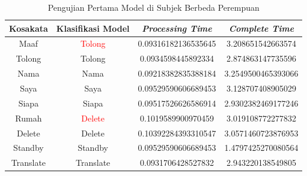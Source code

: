 \begin{longtable}{|c|c|c|c|}
  \caption{Pengujian Pertama Model di Subjek Berbeda Perempuan}
  \label{tb:prediksiperempuan1}                                   \\
  \hline
  \rowcolor[HTML]{C0C0C0}
  \textbf{Kosakata} & \textbf{Klasifikasi Model} & \textbf{\emph{Processing Time}} & \textbf{\emph{Complete Time}}\\
  \hline
  Maaf              & \textcolor{red}{Tolong}                        & 0.09316182136535645                           & 3.208651542663574                                  \\
  Tolong            & Tolong                        & 0.0934598445892334                           & 2.874863147735596                                  \\
  Nama              & Nama                        & 0.09218382835388184                           & 3.2549500465393066                                  \\
  Saya              & Saya                        & 0.09529590606689453                           & 3.128707408905029                                  \\
  Siapa              & Siapa                        & 0.09517526626586914                           & 2.9302382469177246                                  \\
  Rumah             & \textcolor{red}{Delete}                        & 0.1019589900970459                           & 3.019108772277832                                  \\
  Delete            & Delete                        & 0.10392284393310547                           & 3.0571460723876953                                  \\
  Standby           & Standby                        & 0.09529590606689453                           & 1.4797425270080564                                  \\
  Translate         & Translate                        & 0.0931706428527832                           & 2.943220138549805                                  \\
  \hline
\end{longtable}

